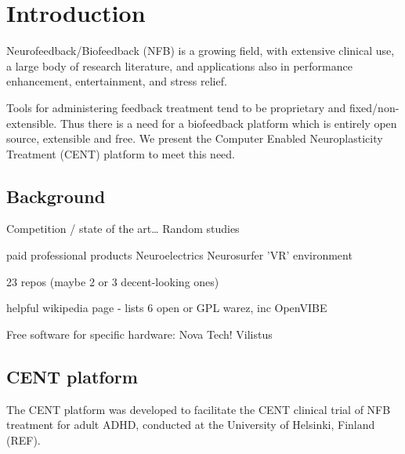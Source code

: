 \documentclass[fleqn,10pt]{wlpeerj}
\begin{document}
\newpage




\section{Introduction}

Neurofeedback/Biofeedback (NFB) is a growing field, with extensive clinical use, a large body of research literature, and applications also in performance enhancement, entertainment, and stress relief. 

Tools for administering feedback treatment tend to be proprietary and fixed/non-extensible. Thus there is a need for a biofeedback platform which is entirely open source, extensible and free. We present the Computer Enabled Neuroplasticity Treatment (CENT) platform to meet this need.




\subsection{Background}

Competition / state of the art…
Random studies

paid professional products
Neuroelectrics Neurosurfer 'VR' environment


23 repos (maybe 2 or 3 decent-looking ones)

helpful wikipedia page - lists 6 open or GPL warez, inc OpenVIBE

Free software for specific hardware:
Nova Tech!
Vilistus


\subsection{CENT platform}

The CENT platform was developed to facilitate the CENT clinical trial of NFB treatment for adult ADHD, conducted at the University of Helsinki, Finland (REF). 
\end{document}
